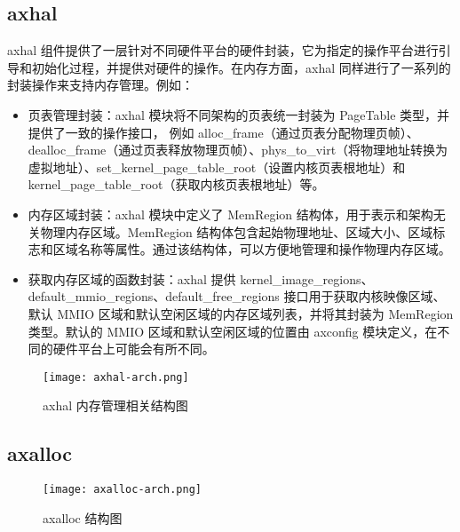 \subsection{axhal}

axhal 组件提供了一层针对不同硬件平台的硬件封装，它为指定的操作平台进行引导和初始化过程，并提供对硬件的操作。在内存方面，axhal 同样进行了一系列的封装操作来支持内存管理。例如：

\begin{itemize}
\item 页表管理封装：axhal 模块将不同架构的页表统一封装为 PageTable 类型，并提供了一致的操作接口，
例如 alloc\_frame（通过页表分配物理页帧）、dealloc\_frame（通过页表释放物理页帧）、phys\_to\_virt（将物理地址转换为虚拟地址）、set\_kernel\_page\_table\_root（设置内核页表根地址）和kernel\_page\_table\_root（获取内核页表根地址）等。
\item 内存区域封装：axhal 模块中定义了 MemRegion 结构体，用于表示和架构无关物理内存区域。MemRegion 结构体包含起始物理地址、区域大小、区域标志和区域名称等属性。通过该结构体，可以方便地管理和操作物理内存区域。
\item 获取内存区域的函数封装：axhal 提供 kernel\_image\_regions、default\_mmio\_regions、default\_free\_regions 接口用于获取内核映像区域、默认 MMIO 区域和默认空闲区域的内存区域列表，并将其封装为 MemRegion 类型。默认的 MMIO 区域和默认空闲区域的位置由 axconfig 模块定义，在不同的硬件平台上可能会有所不同。
\end{itemize}

\begin{figure}
  \centering
  \texttt{[image: axhal-arch.png]}
  \caption{axhal 内存管理相关结构图}
  \label{fig:axhal-arch}
\end{figure}



\subsection{axalloc}

\begin{figure}
  \centering
  \texttt{[image: axalloc-arch.png]}
  \caption{axalloc 结构图}
  \label{fig:axalloc-arch}
\end{figure}

